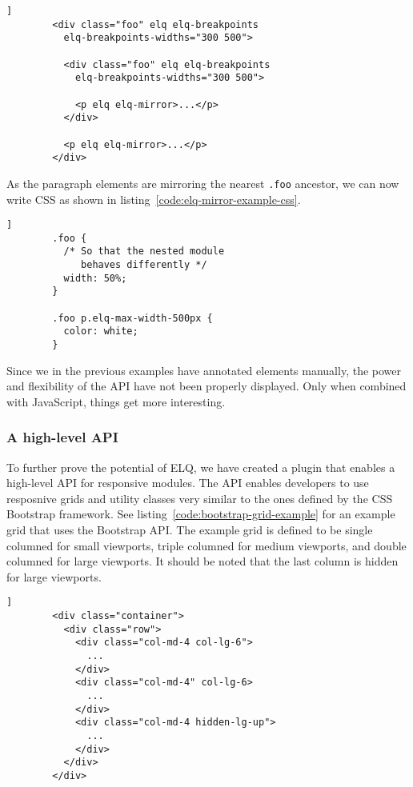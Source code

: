 \documentclass{acm_proc_article-sp}
\newcommand{\code}[1]{\texttt{#1}}
\newcommand{\elq}{ELQ}
\begin{document}
      \begin{lstlisting}[gobble=8,caption={},captionpos=b,label={code:elq-mirror-example}]]
        <div class="foo" elq elq-breakpoints
          elq-breakpoints-widths="300 500">
          
          <div class="foo" elq elq-breakpoints
            elq-breakpoints-widths="300 500">

            <p elq elq-mirror>...</p>
          </div>

          <p elq elq-mirror>...</p>
        </div>
      \end{lstlisting}

      As the paragraph elements are mirroring the nearest \code{.foo} ancestor, we can now write CSS as shown in listing~\ref{code:elq-mirror-example-css}.

      \begin{lstlisting}[gobble=8,caption={},captionpos=b,label={code:elq-mirror-example-css}]]
        .foo {
          /* So that the nested module 
             behaves differently */
          width: 50%;
        }

        .foo p.elq-max-width-500px {
          color: white;
        }
      \end{lstlisting}

      Since we in the previous examples have annotated elements manually, the power and flexibility of the API have not been properly displayed.
      Only when combined with JavaScript, things get more interesting.
    \subsubsection{A high-level API}
      To further prove the potential of \elq{}, we have created a plugin that enables a high-level API for responsive modules.
      The API enables developers to use resposnive grids and utility classes very similar to the ones defined by the CSS Bootstrap framework.
      See listing~\ref{code:bootstrap-grid-example} for an example grid that uses the Bootstrap API.
      The example grid is defined to be single columned for small viewports, triple columned for medium viewports, and double columned for large viewports.
      It should be noted that the last column is hidden for large viewports.

      \begin{lstlisting}[gobble=8,caption={},captionpos=b,label={code:bootstrap-grid-example}]]
        <div class="container">
          <div class="row">
            <div class="col-md-4 col-lg-6">
              ...
            </div>
            <div class="col-md-4" col-lg-6>
              ...
            </div>
            <div class="col-md-4 hidden-lg-up">
              ...
            </div>
          </div>
        </div>
      \end{lstlisting}
      
\end{document}
